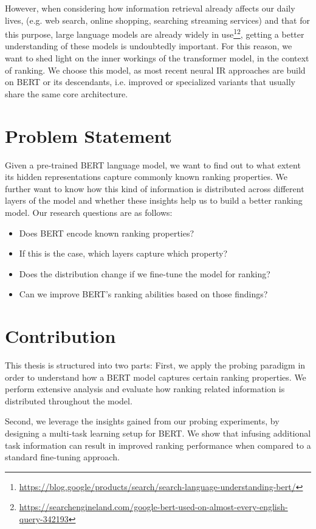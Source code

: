 However, when considering how information retrieval already affects our daily lives, (e.g. web search, online shopping, searching streaming services) and that for this purpose, large language models are already widely in use\footnote{\url{https://blog.google/products/search/search-language-understanding-bert/}}\footnote{\url{https://searchengineland.com/google-bert-used-on-almost-every-english-query-342193}}, getting a better understanding of these models is undoubtedly important. For this reason, we want to shed light on the inner workings of the  \cite{devlin-etal-2019-bert} transformer model, in the context of ranking. We choose this model, as most recent neural IR approaches are build on BERT or its descendants, i.e. improved or specialized variants that usually share the same core architecture.

\section{Problem Statement}
Given a pre-trained BERT language model, we want to find out to what extent its hidden representations capture commonly known ranking properties. We further want to know how this kind of information is distributed across different layers of the model and whether these insights help us to build a better ranking model. Our research questions are as follows:
\begin{itemize}
    \item Does BERT encode known ranking properties?
    \item If this is the case, which layers capture which property?
    \item Does the distribution change if we fine-tune the model for ranking?
    \item Can we improve BERT's ranking abilities based on those findings?
\end{itemize}

\section{Contribution}
This thesis is structured into two parts: First, we apply the probing paradigm in order to understand how a BERT model captures certain ranking properties. We perform extensive analysis and evaluate how ranking related information is distributed throughout the model.

Second, we leverage the insights gained from our probing experiments, by designing a multi-task learning setup for BERT. We show that infusing additional task information can result in improved ranking performance when compared to a standard fine-tuning approach.

